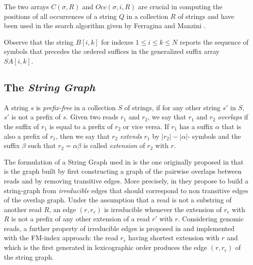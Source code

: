 \documentclass[runningheads,envcountsame,a4paper]{llncs}
\begin{document}

The two arrays $C(\sigma, R)$ and $Occ(\sigma, i, R)$ are crucial in computing  the positions of all occurrences of a string $Q$  in a collection $R$ of
strings and have been used in the search algorithm given by Ferragina and Manzini \cite{Ferragina2000}.

Observe  that the string $B[i,k]$ for indexes $1 \leq i \leq k \leq N$ reports the sequence of symbols that precedes the ordered suffices in the generalized  suffix array $SA[i,k]$.





\subsection*{The \emph{String Graph}}


A string $s$ is \emph{prefix-free} in a collection $S$ of strings,  if  for any  other string $s'$  in $S$, $s'$ is not a prefix of $s$.
 Given two reads $r_1$ and $r_2$, we say that $r_1$ and $r_2$ {\em overlaps}    if the suffix of $r_1$ is equal to a prefix of $r_2$ or vice versa.  If $r_1$ has a suffix $\alpha$ that is also a prefix of $r_1$, then we say that $r_2$  \emph{extends} $r_1$  by $|r_2|- |\alpha|$- symbols and the suffix $\beta$ such that $r_2 = \alpha \beta$ is called \emph{extension} of  $r_2$ with $r$.

The formulation of a  String Graph  used in \cite{Simpson2010} is the one originally proposed in \cite{Myers2005} that is the graph built by first constructing a graph of
the pairwise overlaps between   reads and  by removing transitive edges. More precisely, in \cite{Simpson2010} they propose to build a string-graph from \emph{irreducible} edges that should correspond  to non transitive edges  of the overlap graph.  Under the assumption that  a read is not a substring of another read $R$, an edge $(r, r_e)$  is irreducible whenever the extension of $r_e$ with $R$ is not a prefix of any other extension of a read $r'$ with $r$.  Considering genomic reads, a further property of irreducible edges is proposed in \cite{Simpson2010} and implemented with the FM-index approach:  the read $r_e$ having shortest extension with $r$ and  which  is the first generated in lexicographic order produces the edge $(r,r_e)$ of the string graph.
\end{document}
